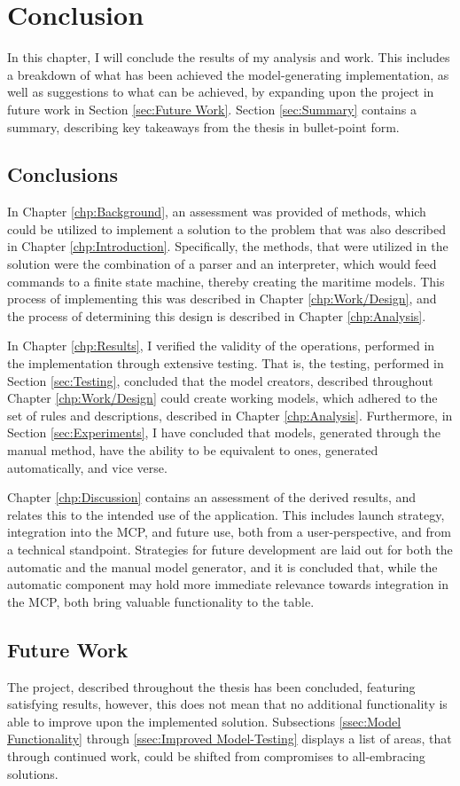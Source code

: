 \chapter{Conclusion}
In this chapter, I will conclude the results of my analysis and work. This includes a breakdown of what has been achieved the model-generating implementation, as well as suggestions to what can be achieved, by expanding upon the project in future work in Section \ref{sec:Future Work}. Section \ref{sec:Summary} contains a summary, describing key takeaways from the thesis in bullet-point form.
\section{Conclusions}
In Chapter \ref{chp:Background}, an assessment was provided of methods, which could be utilized to implement a solution to the problem that was also described in Chapter \ref{chp:Introduction}. Specifically, the methods, that were utilized in the solution were the combination of a parser and an interpreter, which would feed commands to a finite state machine, thereby creating the maritime models. This process of implementing this was described in Chapter \ref{chp:Work/Design}, and the process of determining this design is described in Chapter \ref{chp:Analysis}.

In Chapter \ref{chp:Results}, I verified the validity of the operations, performed in the implementation through extensive testing. That is, the testing, performed in Section \ref{sec:Testing}, concluded that the model creators, described throughout Chapter \ref{chp:Work/Design} could create working models, which adhered to the set of rules and descriptions, described in Chapter \ref{chp:Analysis}. Furthermore, in Section \ref{sec:Experiments}, I have concluded that models, generated through the manual method, have the ability to be equivalent to ones, generated automatically, and vice verse.

Chapter \ref{chp:Discussion} contains an assessment of the derived results, and relates this to the intended use of the application. This includes launch strategy, integration into the MCP, and future use, both from a user-perspective, and from a technical standpoint. Strategies for future development are laid out for both the automatic and the manual model generator, and it is concluded that, while the automatic component may hold more immediate relevance towards integration in the MCP, both bring valuable functionality to the table.
\section{Future Work}
The project, described throughout the thesis has been concluded, featuring satisfying results, however, this does not mean that no additional functionality is able to improve upon the implemented solution. Subsections \ref{ssec:Model Functionality} through \ref{ssec:Improved Model-Testing} displays a list of areas, that through continued work, could be shifted from compromises to all-embracing solutions.
